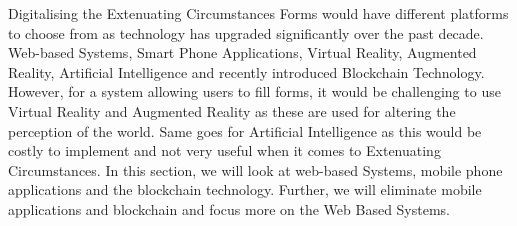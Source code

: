 \documentclass[../main.tex]{subfiles}
\begin{document}
\raggedright
Digitalising the Extenuating Circumstances Forms would have different platforms to choose from as technology has upgraded significantly over the past decade. Web-based Systems, Smart Phone Applications, Virtual Reality, Augmented Reality, Artificial Intelligence\cite{forbestop7} and recently introduced Blockchain Technology. However, for a system allowing users to fill forms, it would be challenging to use Virtual Reality and Augmented Reality as these are used for altering the perception of the world\cite{arvr}. Same goes for Artificial Intelligence as this would be costly to implement and not very useful when it comes to Extenuating Circumstances. In this section, we will look at web-based Systems, mobile phone applications and the blockchain technology. Further, we will eliminate mobile applications and blockchain and focus more on the Web Based Systems.
\end{document}
